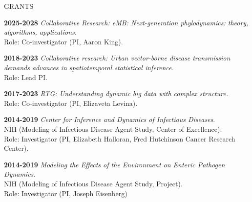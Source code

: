 \begin{mylist} {GRANTS}

\item{\bf 2025-2028} {\em Collaborative Research: eMB: Next-generation phylodynamics: theory, algorithms, applications.}
\\  
Role: Co-investigator (PI, Aaron King). 
  
\item{\bf 2018-2023} {\em Collaborative research: Urban vector-borne disease transmission demands advances in spatiotemporal statistical inference.}
\\
Role: Lead PI.


\item{\bf 2017-2023 } {\em RTG: Understanding dynamic big data with complex structure.} 
\\
Role: Co-investigator (PI, Elizaveta Levina). 

  
\item{\bf 2014-2019 } {\em Center for Inference and Dynamics of Infectious Diseases}.
\\
NIH (Modeling of Infectious Disease Agent Study, Center of Excellence). \\
Role: Investigator (PI, Elizabeth Halloran, Fred Hutchinson Cancer Research Center).

\item{\bf 2014-2019 } {\em Modeling the Effects of the Environment on Enteric Pathogen Dynamics}.
\\
NIH (Modeling of Infectious Disease Agent Study, Project). \\
Role: Investigator (PI, Joseph Eisenberg)  


\end{mylist}
